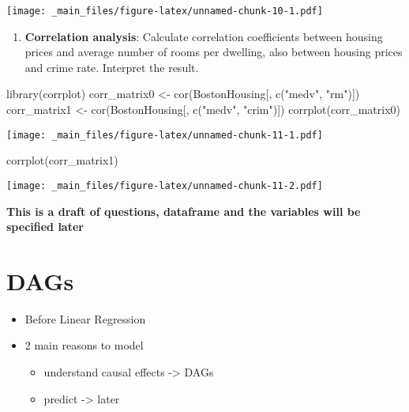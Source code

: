 \documentclass[
]{book}
\newenvironment{Shaded}{\begin{snugshade}}{\end{snugshade}}
\newcommand{\FunctionTok}[1]{\textcolor[rgb]{0.00,0.00,0.00}{#1}}
\newcommand{\FunctionTok}[1]{\textcolor[rgb]{0.13,0.29,0.53}{\textbf{#1}}}
\newcommand{\NormalTok}[1]{#1}
\newcommand{\OtherTok}[1]{\textcolor[rgb]{0.56,0.35,0.01}{#1}}
\newcommand{\StringTok}[1]{\textcolor[rgb]{0.31,0.60,0.02}{#1}}
\providecommand{\tightlist}{%
  \setlength{\itemsep}{0pt}\setlength{\parskip}{0pt}}
\begin{document}
\texttt{[image: \_main\_files/figure-latex/unnamed-chunk-10-1.pdf]}

\begin{enumerate}
\def\labelenumi{\arabic{enumi}.}
\setcounter{enumi}{7}
\tightlist
\item
  \textbf{Correlation analysis}: Calculate correlation coefficients between housing prices and average number of rooms per dwelling, also between housing prices and crime rate. Interpret the result.
\end{enumerate}

\begin{Shaded}
\begin{Highlighting}[]
\FunctionTok{library}\NormalTok{(corrplot)}
\NormalTok{corr\_matrix0 }\OtherTok{\textless{}{-}} \FunctionTok{cor}\NormalTok{(BostonHousing[, }\FunctionTok{c}\NormalTok{(}\StringTok{"medv"}\NormalTok{, }\StringTok{"rm"}\NormalTok{)])}
\NormalTok{corr\_matrix1 }\OtherTok{\textless{}{-}} \FunctionTok{cor}\NormalTok{(BostonHousing[, }\FunctionTok{c}\NormalTok{(}\StringTok{"medv"}\NormalTok{, }\StringTok{"crim"}\NormalTok{)])}
\FunctionTok{corrplot}\NormalTok{(corr\_matrix0)}
\end{Highlighting}
\end{Shaded}

\texttt{[image: \_main\_files/figure-latex/unnamed-chunk-11-1.pdf]}

\begin{Shaded}
\begin{Highlighting}[]
\FunctionTok{corrplot}\NormalTok{(corr\_matrix1)}
\end{Highlighting}
\end{Shaded}

\texttt{[image: \_main\_files/figure-latex/unnamed-chunk-11-2.pdf]}

\textbf{This is a draft of questions, dataframe and the variables will be specified later}

\hypertarget{dags-1}{%
\chapter{DAGs}\label{dags-1}}

\begin{itemize}
\tightlist
\item
  Before Linear Regression
\item
  2 main reasons to model

  \begin{itemize}
  \tightlist
  \item
    understand causal effects -\textgreater{} DAGs
  \item
    predict -\textgreater{} later
  \end{itemize}
\end{itemize}
\end{document}
